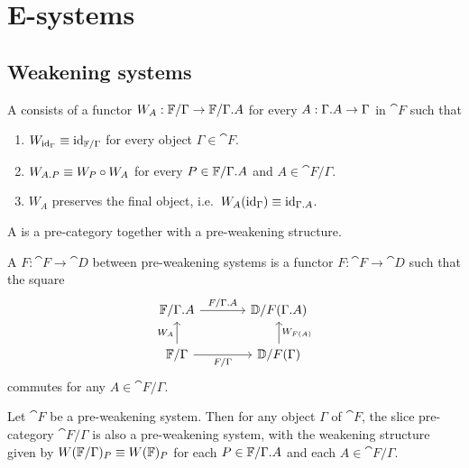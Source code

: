 \section{E-systems}\label{sec:esys_defn}

\subsection{Weakening systems}

\begin{defn}
A  consists of a functor
$W_A:\cat{F}/\Gamma\to \cat{F}/\ctxext{\Gamma}{A}$ for every $A:\ctxext{\Gamma}{A}\to \Gamma$ in $\cat{F}$ such 
that
\begin{enumerate}
\item $W_{{\mathrm{id}_{\Gamma}}}\equiv {\mathrm{id}_{\mathbb{F}/\Gamma}}$ for every object $\Gamma\in\cat{F}$.
\item $W_{\ctxext{A}{P}}\jdeq W_P\circ W_A$ for every $P\in\cat{F}/\ctxext{\Gamma}{A}$ and $A\in\cat{F}/\Gamma$.
\item $W_A$ preserves the final object, i.e.~$W_A(\catid{\Gamma})\jdeq \catid{\ctxext{\Gamma}{A}}$.
\end{enumerate}
A  is a pre-category together with a pre-weakening structure.
\end{defn}

\begin{defn}
A  $F:\cat{F}\to\cat{D}$ between pre-weakening systems
is a functor $F:\cat{F}\to\cat{D}$ such that the square
\begin{equation*}
\begin{tikzcd}[column sep=large]
\cat{F}/\ctxext{\Gamma}{A}
  \arrow[r,"F/\ctxext{\Gamma}{A}"]
  &
\cat{D}/F(\ctxext{\Gamma}{A})
  \\
\cat{F}/\Gamma
  \arrow[u,"W_A"]
  \arrow[r,swap,"F/\Gamma"]
  &
\cat{D}/F(\Gamma)
  \arrow[u,swap,"W_{F(A)}"]
\end{tikzcd}
\end{equation*}
commutes for any $A\in\cat{F}/\Gamma$.
\end{defn}

\begin{lem}
Let $\cat{F}$ be a pre-weakening system. Then for any object $\Gamma$ of $\cat{F}$,
the slice pre-category $\cat{F}/\Gamma$ is also a pre-weakening system, with the weakening
structure given by $W(\mathbb{F}/\Gamma)_P\equiv W(\mathbb{F})_P$ for each $P\in\cat{F}/\ctxext{\Gamma}{A}$
and each $A\in\cat{F}/\Gamma$.
\end{lem}

